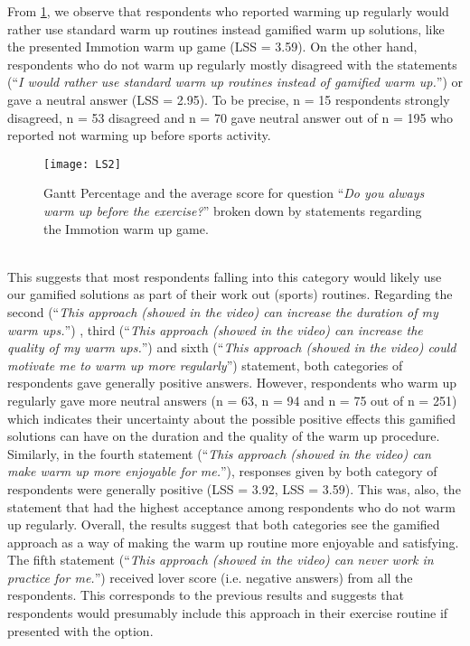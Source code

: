 From \ref{fig:LS2}, we observe that respondents who reported warming up regularly would rather use standard warm up routines instead gamified warm up solutions, like the presented Immotion warm up game (LSS = 3.59). On the other hand, respondents who do not warm up regularly mostly disagreed with the statements (``\textit{I would rather use standard warm up routines instead of gamified warm up.}'') or gave a neutral answer (LSS = 2.95). To be precise, n = 15 respondents strongly disagreed, n = 53 disagreed and n = 70 gave neutral answer out of n = 195 who reported not warming up before sports activity.\\ 
\begin{figure}[h]
    \centering
    \texttt{[image: LS2]}
    \caption{Gantt Percentage and the average score for question ``\textit{Do you always warm up before the exercise?}'' broken down by statements regarding the Immotion warm up game.}
    \label{fig:LS2}
\end{figure}\\ 
This suggests that most respondents falling into this category would likely use our gamified solutions as part of their work out (sports) routines. Regarding the second (``\textit{This approach (showed in the video) can increase the duration of my warm ups.}'') , third (``\textit{This approach (showed in the video) can increase the quality of my warm ups.}'') and sixth (``\textit{This approach (showed in the video) could motivate me to warm up more regularly}'') statement, both categories of respondents gave generally positive answers. However, respondents who warm up regularly gave more neutral answers (n = 63, n = 94 and n = 75 out of n = 251) which indicates their uncertainty about the possible positive effects this gamified solutions can have on the duration and the quality of the warm up procedure.  Similarly, in the fourth statement (``\textit{This approach (showed in the video) can make warm up more enjoyable for me.}''), responses given by both category of respondents were generally positive (LSS = 3.92, LSS = 3.59). This was, also, the statement that had the highest acceptance among respondents who do not warm up regularly. Overall, the results suggest that both categories see the gamified approach as a way of making the warm up routine more enjoyable and satisfying. The fifth statement (``\textit{This approach (showed in the video) can never work in practice for me.}'') received lover score (i.e. negative answers) from all the respondents. This corresponds to the previous results and suggests that respondents would presumably include this approach in their exercise routine if presented with the option.\\\\
